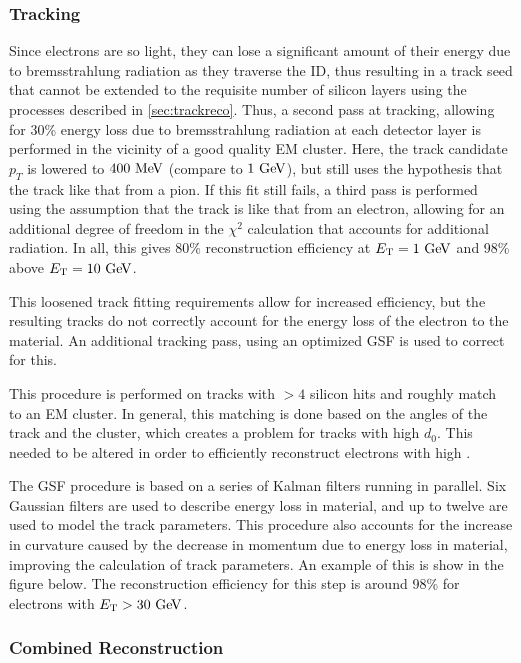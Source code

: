 \subsubsection{Tracking}
Since electrons are so light, they can lose a significant amount of their energy due to bremsstrahlung radiation as they traverse the \ac{ID}, thus resulting in a track seed that cannot be extended to the requisite number of silicon layers using the processes described in \ref{sec:trackreco}. Thus, a second pass at tracking, allowing for 30\% energy loss due to bremsstrahlung radiation at each detector layer is performed in the vicinity of a good quality \ac{EM} cluster. Here, the track candidate $p_{T}$ is lowered to $400 \MeV$ (compare to $1 \GeV$), but still uses the hypothesis that the track like that from a pion. If this fit still fails, a third pass is performed using the assumption that the track is like that from an electron, allowing for an additional degree of freedom in the $\chi^2$ calculation that accounts for additional radiation. In all, this gives 80\% reconstruction efficiency at $\et = 1 \GeV$ and 98\% above $\et = 10 \GeV$. 

This loosened track fitting requirements allow for increased efficiency, but the resulting tracks do not correctly account for the energy loss of the electron to the material. An additional tracking pass, using an optimized \ac{GSF} is used to correct for this. 

This procedure is performed on tracks with $>4$ silicon hits and roughly match to an \ac{EM} cluster. In general, this matching is done based on the angles of the track and the cluster, which creates a problem for tracks with high $d_{0}$. This needed to be altered in order to efficiently reconstruct electrons with high \dzero. 


The \ac{GSF} procedure is based on a series of Kalman filters running in parallel. Six Gaussian filters are used to describe energy loss in material, and up to twelve are used to model the track parameters. This procedure also accounts for the increase in curvature caused by the decrease in momentum due to energy loss in material, improving the calculation of track parameters. An example of this is show in the figure below. The reconstruction efficiency for this step is around 98\% for electrons with $\et > 30 \GeV$. 



\subsubsection{Combined Reconstruction}

